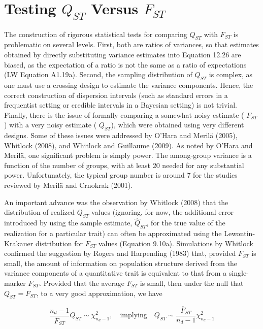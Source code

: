 \documentclass{article}
\begin{document}
\section{Testing  $ Q_{ST} $ Versus  $ F_{ST} $}
The construction of rigorous statistical tests for comparing  $ Q_{ST} $ with  $ F_{ST} $ is problematic on several levels. First, both are ratios of variances, so that estimates obtained by directly substituting variance estimates into Equation 12.26 are biased, as the expectation of a ratio is not the same as a ratio of expectations (LW Equation A1.19a). Second, the sampling distribution of  $ Q_{ST} $ is complex, as one must use a crossing design to estimate the variance components. Hence, the correct construction of dispersion intervals (such as standard errors in a frequentist setting or credible intervals in a Bayesian setting) is not trivial. Finally, there is the issue of formally comparing a somewhat noisy estimate ( $ F_{ST} $) with a very noisy estimate ( $ Q_{ST} $), which were obtained using very different designs. Some of these issues were addressed by O'Hara and Merilä (2005), Whitlock (2008), and Whitlock and Guillaume (2009). As noted by O'Hara and Merilä, one significant problem is simply power. The among-group variance is a function of the number of groups, with at least 20 needed for any substantial power. Unfortunately, the typical group number is around 7 for the studies reviewed by Merilä and Crnokrak (2001).

An important advance was the observation by Whitlock (2008) that the distribution of realized  $ Q_{ST} $ values (ignoring, for now, the additional error introduced by using the sample estimate,  $ \widehat{Q}_{ST} $, for the true value of the realization for a particular trait) can often be approximated using the Lewontin-Krakauer distribution for  $ F_{ST} $ values (Equation 9.10a). Simulations by Whitlock confirmed the suggestion by Rogers and Harpending (1983) that, provided  $ F_{ST} $ is small, the amount of information on population structure derived from the variance components of a quantitative trait is equivalent to that from a single-marker  $ F_{ST} $. Provided that the average  $ F_{ST} $ is small, then under the null that  $ Q_{ST} = F_{ST} $, to a very good approximation, we have

\begin{equation}
\frac{n_{d}-1}{\overline{F}_{ST}}Q_{ST}\sim\chi^{2}_{n_{d}-1},\quad\mathrm{implying}\quad Q_{ST}\sim\frac{\overline{F}_{ST}}{n_{d}-1}\chi^{2}_{n_{d}-1}
\tag{12.28a}
\label{eq:12_28a}
\end{equation}
\end{document}
